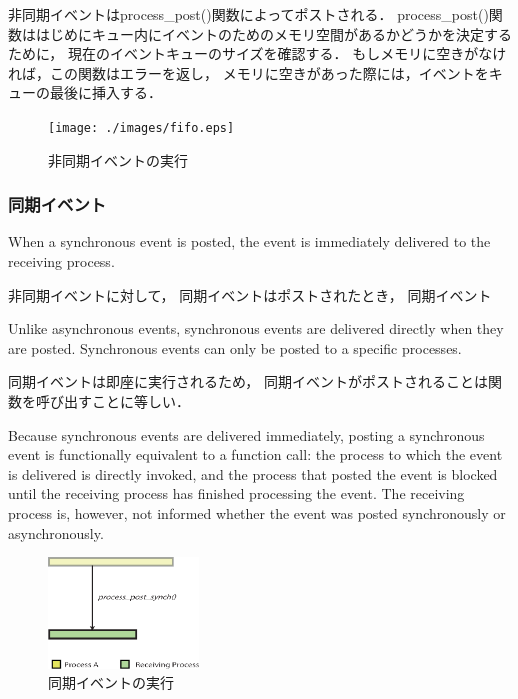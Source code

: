 非同期イベントはprocess\_post()関数によってポストされる．
process\_post()関数ははじめにキュー内にイベントのためのメモリ空間があるかどうかを決定するために，
現在のイベントキューのサイズを確認する．
もしメモリに空きがなければ，この関数はエラーを返し，
メモリに空きがあった際には，イベントをキューの最後に挿入する．


\begin{figure}[htbp]
 \begin{center}
  \texttt{[image: ./images/fifo.eps]}
 \end{center}
 \caption{非同期イベントの実行}
 \label{fig:asynchronous_event}
\end{figure}


\subsubsection{同期イベント}

\vspace{0.5em}When a synchronous event is posted,
the event is immediately delivered to the receiving process.

非同期イベントに対して，
同期イベントはポストされたとき，
同期イベント

Unlike asynchronous events, 
synchronous events are delivered directly when they are posted.
Synchronous events can only be posted to a specific processes.

同期イベントは即座に実行されるため，
同期イベントがポストされることは関数を呼び出すことに等しい．

Because synchronous events are delivered immediately,
posting a synchronous event is functionally equivalent to a function call: 
the process to which the event is delivered is directly invoked, 
and the process that posted the event is blocked until the receiving process has finished processing the event.
The receiving process is, however, not informed whether the event was posted synchronously or asynchronously.
\begin{figure}[htbp]
 \begin{center}
  \includegraphics[width=40mm]{./images/synchronous_event.eps}
 \end{center}
 \caption{同期イベントの実行}
 \label{fig:synchronous_event}
\end{figure}


